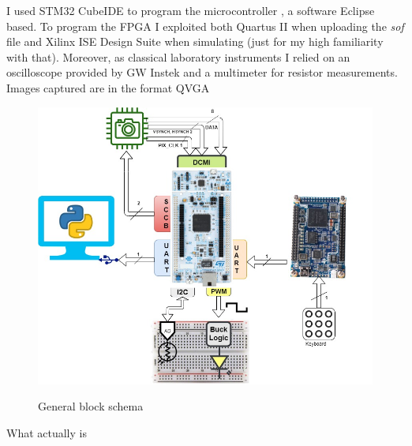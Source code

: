 \newline
\newline
I used STM32 CubeIDE to program the microcontroller , a software Eclipse based. To program the FPGA I exploited both Quartus II when uploading the \textit{sof} file and Xilinx ISE Design Suite when simulating (just for my high familiarity with that). Moreover, as classical laboratory instruments I relied on an oscilloscope provided by GW Instek and a multimeter for resistor measurements.
\newline
\newline
Images captured are in the format QVGA
\begin{figure}[H]
\centering
\includegraphics[scale=.5]{Immagini/01}
\label{01}
\caption{General block schema}
\end{figure}

What actually is

